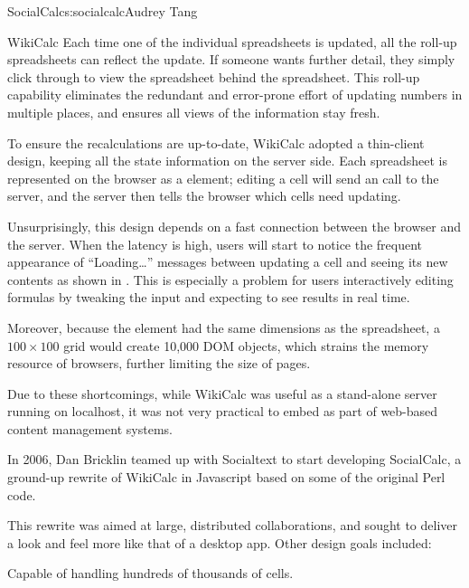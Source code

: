 \begin{aosachapter}{SocialCalc}{s:socialcalc}{Audrey Tang}
\begin{aosasect1}{WikiCalc}
Each time one of the individual spreadsheets is updated, all the
roll-up spreadsheets can reflect the update.  If someone wants further
detail, they simply click through to view the spreadsheet behind the
spreadsheet.  This roll-up capability eliminates the redundant and
error-prone effort of updating numbers in multiple places, and ensures
all views of the information stay fresh.

To ensure the recalculations are up-to-date, WikiCalc adopted a
thin-client design, keeping all the state information on the server
side.  Each spreadsheet is represented on the browser as a
 element; editing a cell will
send an  call to the server, and the server then
tells the browser which cells need updating.

Unsurprisingly, this design depends on a fast connection between the
browser and the server.  When the latency is high, users will start to
notice the frequent appearance of ``Loading\ldots'' messages between
updating a cell and seeing its new contents as shown in
. This is especially a problem for users
interactively editing formulas by tweaking the input and expecting to
see results in real time.


Moreover, because the  element
had the same dimensions as the spreadsheet, a $100{\times}100$ grid
would create 10,000  DOM objects,
which strains the memory resource of browsers, further limiting the
size of pages.

Due to these shortcomings, while WikiCalc was useful as a stand-alone
server running on localhost, it was not very practical to embed as part
of web-based content management systems.

In 2006, Dan Bricklin teamed up with Socialtext to start developing
SocialCalc, a ground-up rewrite of WikiCalc in Javascript based on
some of the original Perl code.

This rewrite was aimed at large, distributed collaborations, and sought
to deliver a look and feel more like that of a desktop app.  Other design
goals included:

\begin{aosaitemize}

  \item Capable of handling hundreds of thousands of cells.


\end{aosaitemize}
\end{aosasect1}
\end{aosachapter}
